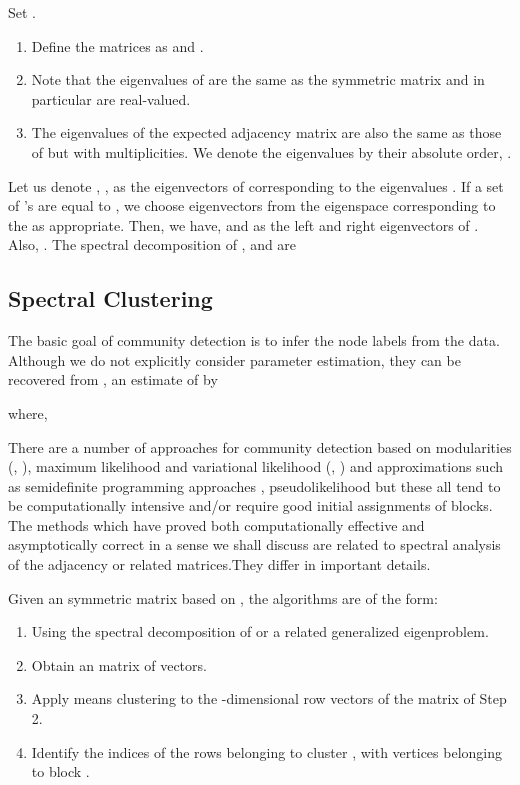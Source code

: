 \documentclass[graybox]{svmult}
\begin{document}
Set . 
\begin{enumerate}
\item Define the matrices as  and .
\item Note that the eigenvalues of  are the same as the symmetric matrix  and in particular are real-valued. 
\item The eigenvalues of the expected adjacency matrix  are also the same as those of  but with multiplicities. We denote the eigenvalues by their absolute order, . 
\end{enumerate}
Let us denote , , as the eigenvectors of  corresponding to the eigenvalues . If a set of 's are equal to , we choose eigenvectors from the eigenspace corresponding to the  as appropriate. Then, we have,  and  as the left and right eigenvectors of . Also, . The spectral decomposition of ,  and  are


\subsection{Spectral Clustering}
\label{sec_specc}
The basic goal of community detection is to infer the node labels  from the data. Although we do not explicitly consider parameter estimation, they can be recovered from , an estimate of  by

where, 








There are a number of approaches for community detection based on modularities (\cite{girvan2002community}, \cite{bickel2009nonparametric}), maximum likelihood and variational likelihood (\cite{MR2988467}, \cite{MR3127853}) and approximations such as  semidefinite programming approaches \cite{amini2014semidefinite}, pseudolikelihood \cite{MR3127859} but these all tend to be computationally intensive  and/or require good initial assignments of blocks. The methods which have proved both computationally effective and asymptotically correct in a sense we shall discuss are related to spectral analysis of the adjacency or related matrices.They differ in important details.  

Given an   symmetric matrix  based on , the algorithms are of the form:
\begin{enumerate}
\item Using the spectral decomposition of  or a related generalized eigenproblem.
\item Obtain an   matrix of   vectors. 
\item Apply  means clustering to  the   -dimensional  row  vectors  of the matrix  of Step 2.
\item Identify  the indices of the rows  belonging to cluster  ,  with vertices belonging to block .
\end{enumerate}
\end{document}
